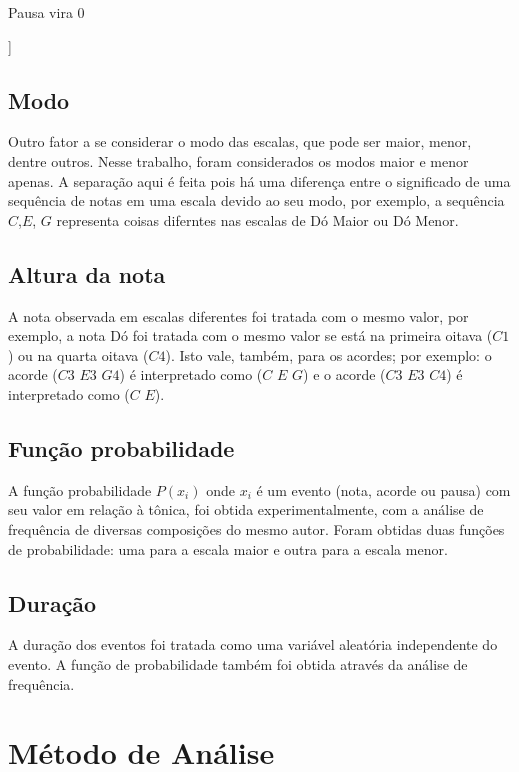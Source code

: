 Pausa vira 0

]

\subsection{Modo}

Outro fator a se considerar o modo das escalas, que pode ser maior, menor, dentre outros. Nesse trabalho, foram considerados os modos maior e menor apenas. A separação aqui é feita pois há uma diferença entre o significado de uma sequência de notas em uma escala devido ao seu modo, por exemplo, a sequência $C$,$E$, $G$ representa coisas diferntes nas escalas de Dó Maior ou Dó Menor.

\subsection{Altura da nota}

A nota observada em escalas diferentes foi tratada com o mesmo valor, por exemplo, a nota Dó foi tratada com o mesmo valor se está na primeira oitava ($C1$) ou na quarta oitava ($C4$). Isto vale, também, para os acordes; por exemplo: o acorde ($C3$ $E3$ $G4$) é interpretado como ($C$ $E$ $G$) e o acorde ($C3$ $E3$ $C4$) é interpretado como ($C$ $E$).

\subsection{Função probabilidade}

A função probabilidade $P(x_i)$ onde $x_i$ é um evento (nota, acorde ou pausa) com seu valor em relação à tônica, foi obtida experimentalmente, com a análise de frequência de diversas composições do mesmo autor. Foram obtidas duas funções de probabilidade: uma para a escala maior e outra para a escala menor.

\subsection{Duração}

A duração dos eventos foi tratada como uma variável aleatória independente do evento. A função de probabilidade também foi obtida através da análise de frequência.

\section{Método de Análise}
